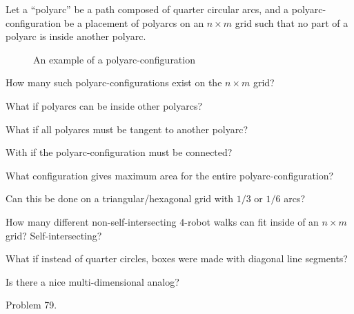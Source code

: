 \documentclass{article}
\begin{document}
Let a ``polyarc'' be a path composed of quarter circular arcs, and a polyarc-configuration be
a placement of polyarcs on an $n \times m$ grid such that no part of a polyarc is
inside another polyarc.
\begin{figure}[ht!]
  \centering
  \caption{
    An example of a polyarc-configuration
  }
\end{figure}
\begin{question}
  How many such polyarc-configurations exist on the $n \times m$ grid?
\end{question}

\begin{related}
  \item What if polyarcs can be inside other polyarcs?
  \item What if all polyarcs must be tangent to another polyarc?
  \item With if the polyarc-configuration must be connected?
  \item What configuration gives maximum area for the entire polyarc-configuration?
  \item Can this be done on a triangular/hexagonal grid with $1/3$ or $1/6$ arcs?
  \item How many different non-self-intersecting $4$-robot walks can fit inside
    of an $n \times m$ grid? Self-intersecting?
  \item What if instead of quarter circles, boxes were made with diagonal line
    segments?
  \item Is there a nice multi-dimensional analog?
\end{related}
\begin{references}
  \item Problem 79.
\end{references}
\end{document}
